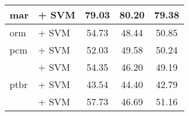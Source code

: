 \begin{sidewaystable}[h]
{\begin{tabular}{llccc}
            \midrule
            mar                                & \citep{wang2024multilingual} + SVM                                 & 79.03                                & 80.20              & 79.38             \\
            \midrule
            orm                                & \citep{wang2024multilingual} + SVM                                 & 54.73                                & 48.44              & 50.85             \\
            \midrule
            pcm                                & \citep{wang2024multilingual} + SVM                                 & 52.03                                & 49.58              & 50.24             \\
            \midrule
            \multirow{5}{*}{ptbr}              & \citep{wang2024multilingual} + SVM                                 & 54.35                                & 46.20              & 49.19             \\
                                               & \citep{filho2023bertportuguesenliassin2} + SVM                     & 43.54                                & 44.40              & 42.79             \\
                                               & \citep{souza2020bertimbau} + SVM                                   & 57.73                                & 46.69              & 51.16             \\

\end{tabular}}
\end{sidewaystable}
